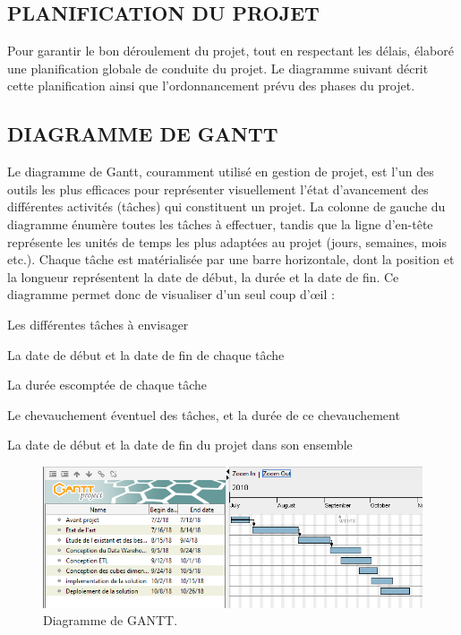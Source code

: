  \subsection{PLANIFICATION DU PROJET}
 
 Pour garantir le bon déroulement du projet, tout en respectant les délais, élaboré une planification globale de conduite du projet. Le diagramme suivant décrit cette planification ainsi que l’ordonnancement prévu des phases du projet. 
 \subsection{DIAGRAMME DE GANTT }
 
  Le diagramme de Gantt, couramment utilisé en gestion de projet, est l’un des outils les plus efficaces pour représenter visuellement l’état d’avancement des différentes activités (tâches) qui constituent un projet. La colonne de gauche du diagramme énumère toutes les tâches à effectuer, tandis que la ligne d’en-tête représente les unités de temps les plus adaptées au projet (jours, semaines, mois etc.). Chaque tâche est matérialisée par une barre horizontale, dont la position et la longueur représentent la date de début, la durée et la date de fin. Ce diagramme permet donc de visualiser d’un seul coup d’œil :
  \begin{list}{•}{ }
   \item Les différentes tâches à envisager
   \item La date de début et la date de fin de chaque tâche
   \item La durée escomptée de chaque tâche
   \item Le chevauchement éventuel des tâches, et la durée de ce chevauchement
   \item La date de début et la date de fin du projet dans son ensemble\\
  \end{list}

\begin{figure}[!htbp]
	\begin{center}
		\includegraphics[scale=0.85]{images/gantt.png}
		\caption{Diagramme de GANTT.}
		\label{use_bi_tools}
	\end{center}
\end{figure}

